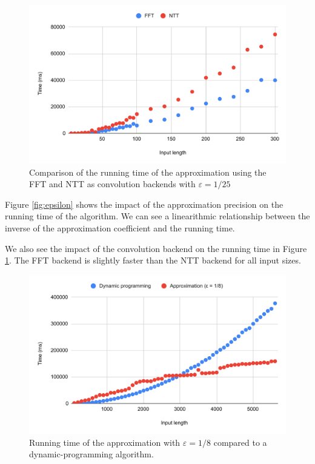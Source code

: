\begin{figure}[h!]
    \centering
    \includegraphics[width=0.8\linewidth]{charts/fft_ntt.pdf}
    \caption{Comparison of the running time of the approximation using the FFT and NTT as convolution backends with $\varepsilon = 1/25$  }
    \label{fig:fft_ntt}
\end{figure}

Figure \ref{fig:epsilon} shows the impact of the approximation precision on the running time of the algorithm. We can see a linearithmic relationship between the inverse of the approximation coefficient and the running time.

We also see the impact of the convolution backend on the running time in  Figure \ref{fig:fft_ntt}. The FFT backend is slightly faster than the NTT backend for all input sizes. 


\begin{figure}[h!]
    \centering
    \includegraphics[width=\linewidth]{charts/dp.pdf}
    \caption{Running time of the approximation with $\varepsilon = 1/8$ compared to a dynamic-programming algorithm.}
    \label{fig:dp}
\end{figure}


